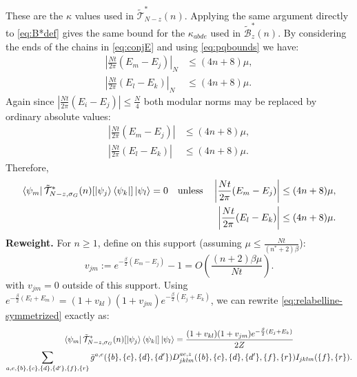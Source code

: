 These are the $\kappa$ values used in $\tilde{\mathcal{T}}^*_{N-z}(n)$. Applying the same argument directly to \eqref{eq:B*def} gives the same bound for the $\kappa_{abde}$ used in $\tilde{\mathcal{B}}^*_z(n)$. By considering the ends of the chains in \eqref{eq:conjE} and using \eqref{eq:pqbounds} we have:
\begin{equation}
\begin{aligned}
    \left|\frac{Nt}{2\pi}(E_m-E_j)\right|_{N}&\leq(4n+8)\mu,\\
    \left|\frac{Nt}{2\pi}(E_l-E_k)\right|_{N}&\leq(4n+8)\mu.
\end{aligned}
\end{equation}
Again since $|\frac{Nt}{2\pi}(E_i - E_j)| \leq \frac{N}{4}$ both modular norms may be replaced by ordinary absolute values:
\begin{equation}
\label{eq:energiessame}
\begin{aligned}
    \left|\frac{Nt}{2\pi}(E_m-E_j)\right|&\leq(4n+8)\mu,\\
    \left|\frac{Nt}{2\pi}(E_l-E_k)\right|&\leq(4n+8)\mu.
\end{aligned}
\end{equation}
Therefore,
\begin{equation}
\begin{aligned}
    \bra{\psi_m}\tilde{\mathcal{T}}^*_{N -z,\sigma_G}(n)[\ket{\psi_j}\bra{\psi_k}]\ket{\psi_l}=0\quad\text{unless}\quad
    \left|\frac{Nt}{2\pi}(E_m-E_j)\right|&\leq(4n+8)\mu,\\
    \left|\frac{Nt}{2\pi}(E_l-E_k)\right|&\leq(4n+8)\mu.
    \label{eq:Bsupport}
\end{aligned}
\end{equation}
\textbf{Reweight.} For $n\geq1$, define on this support (assuming $\mu \leq \frac{Nt}{(n^*+2)\beta}$):
\begin{equation}
    v_{jm}:=e^{-\frac{\beta}{2}(E_m-E_j)}-1=O(\frac{(n+2)\beta \mu}{Nt}).
\end{equation}
with $v_{jm}=0$ outside of this support.
Using $e^{-\frac{\beta}{2}(E_l+E_m)}=(1+v_{kl})(1+v_{jm})e^{-\frac{\beta}{2}(E_j+E_k)}$, we can rewrite \eqref{eq:relabelline-symmetrized} exactly as:
\begin{multline}
    \bra{\psi_m}\tilde{\mathcal{T}}^*_{N -z,\sigma_G}(n)[\ket{\psi_j}\bra{\psi_k}]\ket{\psi_l} =  \frac{(1+v_{kl})(1+v_{jm})e^{-\frac{\beta}{2}(E_j+E_k)}}{2Z}\\\sum_{a,e,\{b\},\{c\},\{d\},\{d'\},\{f\},\{r\}} \bar g^{a,e}(\{b\},\{c\},\{d\},\{d'\}) D^{ae,z}_{jklm}(\{b\},\{c\},\{d\},\{d'\},\{f\},\{r\})I_{jklm}(\{f\},\{r\}).
\end{multline}
